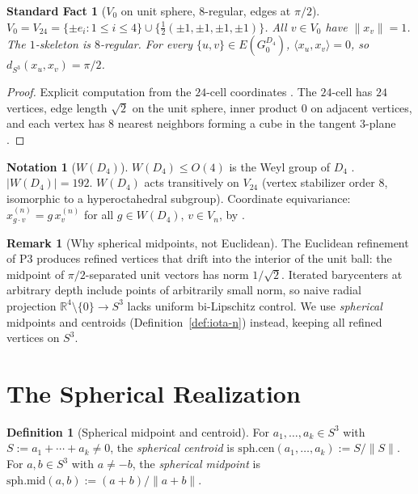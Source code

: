 \documentclass[11pt, a4paper]{amsart}
\newtheorem{fact}[theorem]{Standard Fact}
\theoremstyle{definition}
\newtheorem{definition}[theorem]{Definition}
\newtheorem{remark}[theorem]{Remark}
\newtheorem{notation}[theorem]{Notation}
\newcommand{\R}{\mathbb{R}}
\newcommand{\dsph}{d_{S^3}}
\begin{document}
\begin{fact}[$V_0$ on unit sphere, $8$-regular, edges at $\pi/2$]
\label{fact:V0}
$V_0 = V_{24} = \{\pm e_i : 1 \leq i \leq 4\} \cup
\{\tfrac{1}{2}(\pm 1, \pm 1, \pm 1, \pm 1)\}$. All $v \in V_0$
have $\|x_v\| = 1$. The $1$-skeleton is $8$-regular. For every
$\{u, v\} \in E(G_0^{D_4})$, $\langle x_u, x_v\rangle = 0$, so
$\dsph(x_u, x_v) = \pi/2$.
\end{fact}

\begin{proof}
Explicit computation from the $24$-cell coordinates
\cite[\S 5]{AlgebraicSubstrate}. The $24$-cell has $24$ vertices,
edge length $\sqrt{2}$ on the unit sphere, inner product $0$ on
adjacent vertices, and each vertex has $8$ nearest neighbors
forming a cube in the tangent $3$-plane
\cite[\S 22.2]{CoxeterRegularPolytopes}.
\end{proof}

\begin{notation}[$W(D_4)$]
\label{not:WD4}
$W(D_4) \leq O(4)$ is the Weyl group of $D_4$
\cite[Ch.~1]{Humphreys}. $|W(D_4)| = 192$. $W(D_4)$ acts
transitively on $V_{24}$ (vertex stabilizer order $8$,
isomorphic to a hyperoctahedral subgroup). Coordinate
equivariance: $x_{g \cdot v}^{(n)} = g\,x_v^{(n)}$ for all
$g \in W(D_4)$, $v \in V_n$, by \cite[Lem.~2.4]{MetricProjection}.
\end{notation}

\begin{remark}[Why spherical midpoints, not Euclidean]
\label{rmk:why-spherical}
The Euclidean refinement of P3 produces refined vertices
that drift into the interior of the unit ball: the midpoint of
$\pi/2$-separated unit vectors has norm $1/\sqrt{2}$. Iterated
barycenters at arbitrary depth include points of arbitrarily
small norm, so naive radial projection
$\R^4 \setminus \{0\} \to S^3$ lacks uniform bi-Lipschitz control.
We use \emph{spherical} midpoints and centroids
(Definition~\ref{def:iota-n}) instead, keeping all refined
vertices on $S^3$.
\end{remark}

\section{The Spherical Realization}
\label{sec:spherical}

\begin{definition}[Spherical midpoint and centroid]
\label{def:sph-mid}
For $a_1, \ldots, a_k \in S^3$ with $S := a_1 + \cdots + a_k \neq
0$, the \emph{spherical centroid} is
$\mathrm{sph.cen}(a_1, \ldots, a_k) := S / \|S\|$. For $a, b \in
S^3$ with $a \neq -b$, the \emph{spherical midpoint} is
$\mathrm{sph.mid}(a, b) := (a + b)/\|a + b\|$.
\end{definition}
\end{document}
